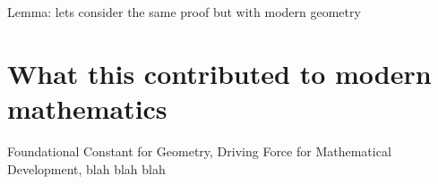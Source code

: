 \documentclass{article}
\begin{document}
\textcolor{Periwinkle}{Lemma: lets consider the same proof but with modern geometry}

\begin{theorem}\label{thm:ipsum}

\end{theorem}

\section{What this contributed to modern mathematics}

\textcolor{Periwinkle}{Foundational Constant for Geometry, Driving Force for Mathematical Development, blah blah blah}


\end{document}
